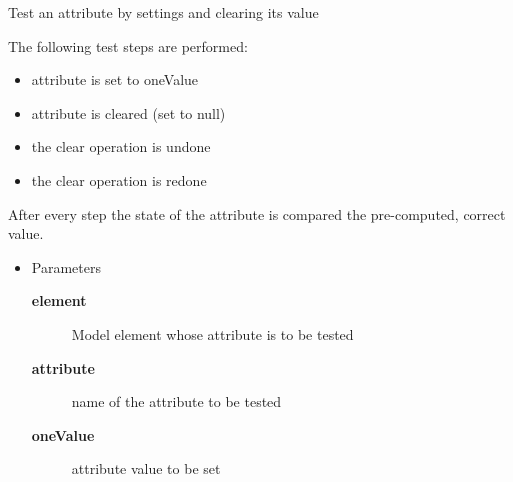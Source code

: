 \begin{desc}Test an attribute by settings and clearing its value

 The following test steps are performed:
 \begin{itemize}

   \item{   attribute is set to oneValue
   }
\item{   attribute is cleared (set to null)
   }
\item{   the clear operation is undone
   }
\item{   the clear operation is redone
 }
\end{itemize}


 After every step the state of the attribute is compared
 the pre-computed, correct value.
\begin{itemize}
\item{Parameters
  \begin{description}
   \item[{\bf element}]{Model element whose attribute is to be tested}
   \item[{\bf attribute}]{name of the attribute to be tested}
   \item[{\bf oneValue}]{attribute value to be set}
  \end{description}}
\end{itemize}
\end{desc}

